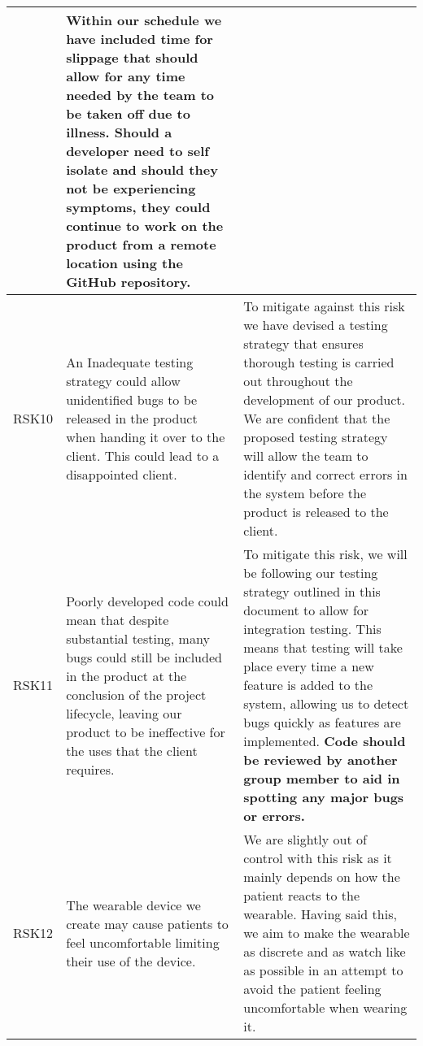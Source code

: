 \begin{xltabular}[H]{\textwidth}{c | X | X}
    &

    Within our schedule we have included time for slippage that should allow for any time needed by the team to be taken off due to illness. Should a developer need to self isolate and should they not be experiencing symptoms, they could continue to work on the product from a remote location using the GitHub repository.\\

    \midrule

    RSK10

    &

    An Inadequate testing strategy could allow unidentified bugs to be released in the product when handing it over to the client. This could lead to a disappointed client.

    &

    To mitigate against this risk we have devised a testing strategy that ensures thorough testing is carried out throughout the development of our product. We are confident that the proposed testing strategy will allow the team to identify and correct errors in the system before the product is released to the client. \\

    \midrule

    RSK11

    &

    Poorly developed code could mean that despite substantial testing, many bugs could still be included in the product at the conclusion of the project lifecycle, leaving our product to be ineffective for the uses that the client requires.

    &

    To mitigate this risk, we will be following our testing strategy outlined in this document to allow for integration testing. This means that testing will take place every time a new feature is added to the system, allowing us to detect bugs quickly as features are implemented. \textbf{Code should be reviewed by another group member to aid in spotting any major bugs or errors.}\\

    \midrule

    RSK12

    &

    The wearable device we create may cause patients to feel uncomfortable limiting their use of the device.

    &

    We are slightly out of control with this risk as it mainly depends on how the patient reacts to the wearable. Having said this, we aim to make the wearable as discrete and as watch like as possible in an attempt to avoid the patient feeling uncomfortable when wearing it.\\


\end{xltabular}
